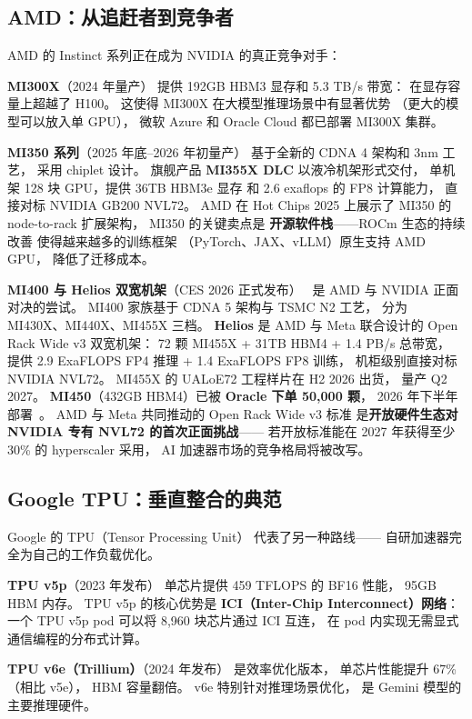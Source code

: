 \subsection{AMD：从追赶者到竞争者}

AMD 的 Instinct 系列正在成为 NVIDIA 的真正竞争对手：

\textbf{MI300X}（2024 年量产）
提供 192GB HBM3 显存和 5.3 TB/s 带宽：
在显存容量上超越了 H100。
这使得 MI300X 在大模型推理场景中有显著优势
（更大的模型可以放入单 GPU），
微软 Azure 和 Oracle Cloud 都已部署 MI300X 集群。

\textbf{MI350 系列}（2025 年底--2026 年初量产）
基于全新的 CDNA 4 架构和 3nm 工艺，
采用 chiplet 设计。
旗舰产品 \textbf{MI355X DLC} 以液冷机架形式交付，
单机架 128 块 GPU，提供 36TB HBM3e 显存
和 2.6 exaflops 的 FP8 计算能力，
直接对标 NVIDIA GB200 NVL72。
AMD 在 Hot Chips 2025 上展示了 MI350 的 node-to-rack 扩展架构，
MI350 的关键卖点是
\textbf{开源软件栈}——ROCm 生态的持续改善
使得越来越多的训练框架
（PyTorch、JAX、vLLM）原生支持 AMD GPU，
降低了迁移成本。

\textbf{MI400 与 Helios 双宽机架}（CES 2026 正式发布）%
~\cite{amd_mi400_helios_2026}是 AMD 与 NVIDIA 正面对决的尝试。
MI400 家族基于 CDNA 5 架构与 TSMC N2 工艺，
分为 MI430X、MI440X、MI455X 三档。
\textbf{Helios} 是 AMD 与 Meta 联合设计的 Open Rack Wide v3 双宽机架：
72 颗 MI455X + 31TB HBM4 + 1.4 PB/s 总带宽，
提供 2.9 ExaFLOPS FP4 推理 + 1.4 ExaFLOPS FP8 训练，
机柜级别直接对标 NVIDIA NVL72。
MI455X 的 UALoE72 工程样片在 H2 2026 出货，
量产 Q2 2027。
\textbf{MI450}（432GB HBM4）已被 \textbf{Oracle 下单 50,000 颗}，
2026 年下半年部署~\cite{amd_mi450_oracle_2026}。
AMD 与 Meta 共同推动的 Open Rack Wide v3 标准
是\textbf{开放硬件生态对 NVIDIA 专有 NVL72 的首次正面挑战}——
若开放标准能在 2027 年获得至少 30\% 的 hyperscaler 采用，
AI 加速器市场的竞争格局将被改写。

\subsection{Google TPU：垂直整合的典范}

Google 的 TPU（Tensor Processing Unit）
代表了另一种路线——
自研加速器完全为自己的工作负载优化。

\textbf{TPU v5p}（2023 年发布）
单芯片提供 459 TFLOPS 的 BF16 性能，
95GB HBM 内存。
TPU v5p 的核心优势是
\textbf{ICI（Inter-Chip Interconnect）网络}：
一个 TPU v5p pod 可以将 8,960 块芯片通过 ICI 互连，
在 pod 内实现无需显式通信编程的分布式计算。

\textbf{TPU v6e（Trillium）}（2024 年发布）
是效率优化版本，
单芯片性能提升 67\%（相比 v5e），
HBM 容量翻倍。
v6e 特别针对推理场景优化，
是 Gemini 模型的主要推理硬件。

